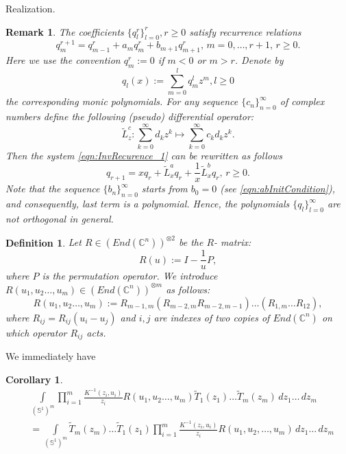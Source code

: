 \documentclass[10pt]{article}%
\numberwithin{equation}{section}
\newtheorem{cor}[thm]{Corollary}
\newtheorem{defin}[thm]{Definition}
\newtheorem{rem}[thm]{Remark}
\def\suml{\sum\limits}
\begin{document}
\begin{paragraph}{Realization.}
\begin{rem}
The coefficients $\{q_l^r\}_{l=0}^r, r\geq 0$ satisfy recurrence relations
\begin{equation}\label{eqn:InvRecurence_1}
q_m^{r+1}=q_{m-1}^r+a_m q_m^r+b_{m+1} q_{m+1}^r,\, m=0,\ldots, r+1,\, r\geq 0.
\end{equation}
Here we use the convention  $q_m^r:=0$ if $m<0$ or $m>r$. Denote by 
\[
q_l(x):=\sum\limits_{m=0}^{l}q_{m}^{l}z^{m}, l\geq 0
\]
the corresponding monic polynomials. For any sequence $\{c_n\}_{n=0}^{\infty}$ of complex numbers define
the following (pseudo) differential operator:
\[
\tilde{L}^c_z:\suml_{k=0}^{\infty} d_k z^{k}\mapsto \suml_{k=0}^{\infty} c_k d_k z^{k}.
\]
 Then the system \eqref{eqn:InvRecurence_1} can be rewritten as follows
\begin{equation}\label{eqn:InvRecurence_2}
q_{r+1}=x q_r+ \tilde{L}_x^{a}q_r+\frac{1}{x}\tilde{L}_x^{b}q_r,\,r\geq 0.
\end{equation}
Note that the sequence $\{b_n\}_{n=0}^{\infty}$ starts from $b_0=0$ (see \eqref{eqn:abInitCondition}), and consequently, last term is a polynomial. Hence, the polynomials $\{q_l\}_{l=0}^{\infty}$ are not  orthogonal in general.
\end{rem}


\begin{defin}
Let $R\in (End(\mathbb{C}^n))^{\otimes 2}$ be the   $R$- matrix:
\[
R(u):=I-\frac{1}{u}P,
\]
 where $P$ is the permutation operator. 
 We introduce 
 $R(u_1,u_2\ldots,u_m)\in (End(\mathbb{C}^n))^{\otimes m}$ as follows:
\begin{equation}
    R(u_1,u_2\ldots,u_m):=R_{m-1,m}\left(R_{m-2,m}R_{m-2,m-1}\right)\ldots \left(R_{1,m}\ldots R_{12}\right),
\end{equation}  
where $R_{ij}=R_{ij}(u_i-u_j)$ and $i,j$ are indexes of two copies of $End(\mathbb{C}^n)$ on which operator $R_{ij}$ acts.
\end{defin}

We immediately have
\begin{cor}
\begin{eqnarray}   &\int\limits_{(\mathbb{S}^1)^m}\prod\limits_{i=1}^m \frac{K^{-1}(z_i,u_i)}{z_i} R(u_1,u_2\ldots,u_m)\tilde{T}_1(z_1)\ldots\tilde{T}_m(z_m)\,dz_1\ldots \,dz_m\nonumber\\
&=\int\limits_{(\mathbb{S}^1)^m}\tilde{T}_m(z_m)\ldots\tilde{T}_1(z_1)\prod\limits_{i=1}^m \frac{K^{-1}(z_i,u_i)}{z_i}R(u_1,u_2,\ldots,u_m)\,dz_1\ldots \,dz_m
\end{eqnarray}  
\end{cor}


\end{paragraph}
\end{document}
